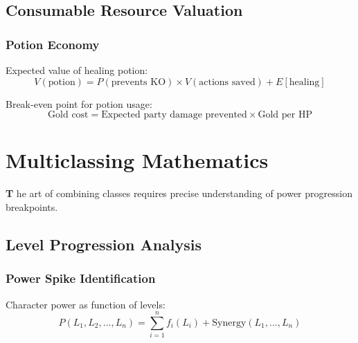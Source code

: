 \documentclass[11pt,letterpaper,openany]{book}
\newcommand{\firstletter}[1]{%
    \textcolor{bloodred}{\fontsize{48}{48}\selectfont\bfseries #1}%
}
\begin{document}
\section{Consumable Resource Valuation}

\subsection{Potion Economy}

Expected value of healing potion:
\begin{equation}
V(\text{potion}) = P(\text{prevents KO}) \times V(\text{actions saved}) + E[\text{healing}]
\end{equation}

Break-even point for potion usage:
\begin{equation}
\text{Gold cost} = \text{Expected party damage prevented} \times \text{Gold per HP}
\end{equation}

\chapter{Multiclassing Mathematics}

\firstletter{T}he art of combining classes requires precise understanding of power progression breakpoints.

\section{Level Progression Analysis}

\subsection{Power Spike Identification}

Character power as function of levels:
\begin{equation}
P(L_1, L_2, ..., L_n) = \sum_{i=1}^{n} f_i(L_i) + \text{Synergy}(L_1, ..., L_n)
\end{equation}
\end{document}
